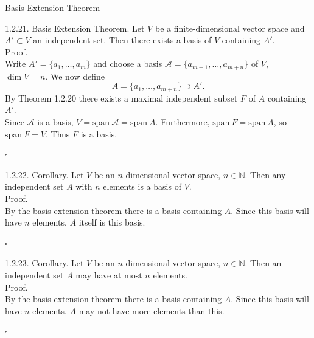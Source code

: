 \documentclass[smaller,hyperref={CJKbookmarks=true}]{beamer}
\newcommand{\N}{\mathbb{N}}
\begin{document}
\begin{frame}{Basis Extension Theorem} \begin{spacing}{1.1}
\alert{1.2.21. Basis Extension Theorem.} Let $V$ be a finite-dimensional vector space and $A'\subset V$ an independent set. Then there exists a basis of $V$ containing $A'$.\\[12pt]
\alert{Proof.}\\
Write $A'=\{a_1,\ldots,a_m\}$ and choose a basis $\mathcal{A}=\{a_{m+1},\ldots,a_{m+n}\}$ of $V$, $\dim V=n.$ We now define
\[A=\{a_1,\ldots,a_{m+n}\}\supset A'.\]
By Theorem 1.2.20 there exists a maximal independent subset $F$ of $A$ containing $A'$.\\[10pt]
Since $\mathcal{A}$ is a basis, $V=\text{span}~\mathcal{A}=\text{span}~A.$ Furthermore, $\text{span}~F=\text{span}~A$, so $\text{span}~F=V$. Thus $F$ is a basis.
\begin{flushright}
  $\square$
\end{flushright}
\newpage
\alert{1.2.22. Corollary.} Let $V$ be an $n$-dimensional vector space, $n\in\N$. Then any independent set $A$ with $n$ elements is a basis of $V$.\\[12pt]
\alert{Proof.}\\
By the basis extension theorem there is a basis containing $A$. Since this basis will have $n$ elements, $A$ itself is this basis.
\begin{flushright}
  $\square$
\end{flushright}
\alert{1.2.23. Corollary.} Let $V$ be an $n$-dimensional vector space, $n\in\N$. Then an independent set $A$ may have at most $n$ elements.\\[12pt]
\alert{Proof.}\\
By the basis extension theorem there is a basis containing $A$. Since this basis will have $n$ elements, $A$ may not have more elements than this.
\begin{flushright}
  $\square$
\end{flushright}
\end{spacing}
\end{frame}
\end{document}
